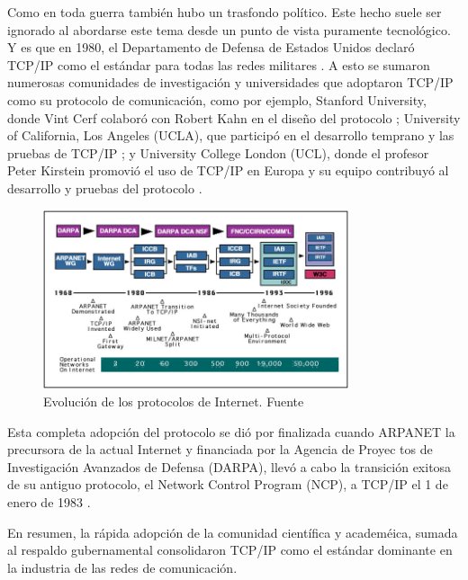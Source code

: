 Como en toda guerra también hubo un trasfondo político. Este hecho suele ser ignorado al abordarse este tema desde un punto de vista puramente tecnológico.
Y es que en 1980, el Departamento de Defensa de Estados Unidos declaró TCP/IP como el estándar para todas las redes militares \cite{leinerBriefHistoryInternet1999}.
A esto se sumaron numerosas comunidades de investigación y universidades que adoptaron TCP/IP como su protocolo de comunicación, como por ejemplo, Stanford University, donde Vint Cerf colaboró con Robert Kahn en el diseño del protocolo \cite{leinerBriefHistoryInternet1999}; University of California, Los Angeles (UCLA), que participó en el desarrollo temprano y las pruebas de TCP/IP \cite{leinerBriefHistoryInternet1999}; y University College London (UCL), donde el profesor Peter Kirstein promovió el uso de TCP/IP en Europa y su equipo contribuyó al desarrollo y pruebas del protocolo \cite{moriPeterKirsteinObituary2020}.

\begin{figure}[H]
      \centering
      \includegraphics[width=0.8\textwidth]{images/TimelineOfTheInternetProtocols.png}
      \caption[Evolución de los protocolos de Internet]{Evolución de los protocolos de Internet. Fuente \cite{leinerBriefHistoryInternet1999}}
\end{figure}

Esta completa adopción del protocolo se dió por finalizada cuando ARPANET la precursora de la actual Internet y financiada por la Agencia de Proyec
tos de Investigación Avanzados de Defensa (DARPA), llevó a cabo la transición exitosa de su antiguo protocolo, el Network Control Program (NCP),
a TCP/IP el 1 de enero de 1983
\cite{leinerBriefHistoryInternet1999}.

En resumen, la rápida adopción de la comunidad científica y academéica, sumada al respaldo gubernamental consolidaron TCP/IP como el estándar dominante en la industria de las redes de comunicación.

